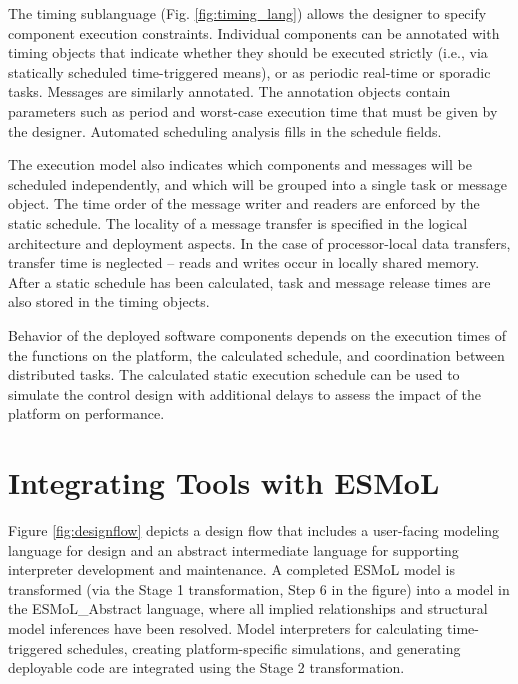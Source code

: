 \begin{itemize}
The timing sublanguage (Fig. \ref{fig:timing_lang}) allows 
the designer to specify component execution
constraints.  Individual components can be annotated with 
timing objects that indicate whether they should be executed 
strictly (i.e., via statically scheduled time-triggered means), 
or as periodic real-time or sporadic tasks. 
Messages are similarly annotated.  
The annotation objects contain parameters such as period and 
worst-case execution time that must be given by the designer.  
Automated scheduling analysis fills in the schedule fields.

The execution model also indicates which components and messages 
will be scheduled independently, and which will be
grouped into a single task or message object. 
The time order of the message writer and readers are enforced 
by the static schedule. The locality of a message transfer is
specified in the logical architecture and deployment aspects. 
In the case of processor-local data transfers, transfer time is 
neglected -- reads and writes occur in locally shared memory. 
After a static schedule has been calculated, task and message 
release times are also stored in the timing objects.

Behavior of the deployed 
software components depends on the execution times of 
the functions on the platform, the calculated schedule, 
and coordination between distributed tasks. The 
calculated static execution schedule can be used to simulate the 
control design with additional delays to assess the impact 
of the platform on performance.

\end{itemize}

\section{Integrating Tools with ESMoL}
\label{section:twostage}

Figure \ref{fig:designflow} depicts a design flow 
that includes a user-facing modeling language 
for design and an abstract intermediate language 
for supporting interpreter development and
maintenance.  A completed ESMoL model is 
transformed (via the Stage 1 
transformation, Step 6 in the figure) into a model in the ESMoL\_Abstract 
language, where all implied relationships and structural 
model inferences have been resolved.  Model interpreters 
for calculating time-triggered schedules, creating 
platform-specific simulations, and generating deployable 
code are integrated using the Stage 2 transformation.


